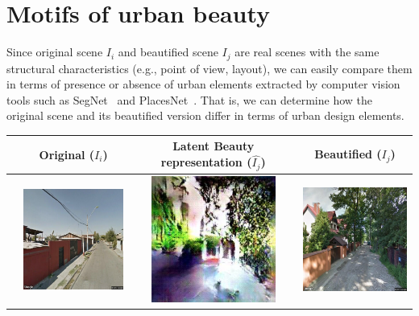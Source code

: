 \section{Motifs of urban beauty}
Since original scene $I_i$ and beautified scene $I_j$ are real scenes with the  same structural characteristics (e.g., point of view, layout), we can easily compare them in terms of presence or absence of urban elements extracted by computer vision tools such as SegNet~\cite{badrinarayanan2015segnet} and PlacesNet~\cite{zhou2014learning}. That is, we can determine how the original scene and its beautified version differ in terms of urban design elements. 

\begin{table}\sffamily
    \begin{tabular}{l*3{C}@{}}
        \toprule
        & Original ($I_i$) & Latent Beauty representation ($\hat{I_j}$) & Beautified ($I_j$) \\ 
        \midrule
        & \includegraphics[width=11em]{u_9.png} & \includegraphics[width=11em]{t_9.png} &  \includegraphics[width=11em]{b_9.png} \\ 

\end{tabular}
\end{table}
